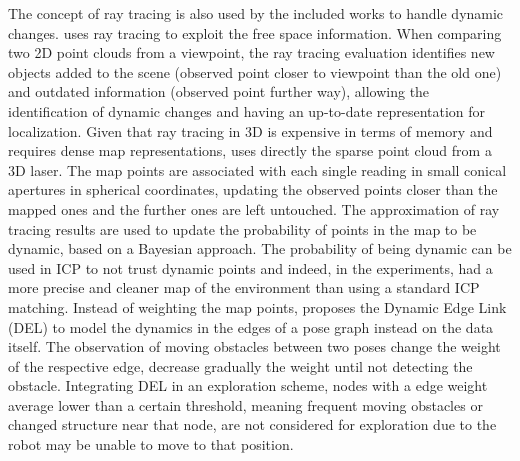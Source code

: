 The concept of ray tracing is also used by the included works to handle dynamic changes.
\cite{lázaro-et-al:2018:8594310} uses ray tracing to exploit the free space information. When comparing two 2D point clouds from a viewpoint, the ray tracing evaluation identifies new objects added to the scene (observed point closer to viewpoint than the old one) and outdated information (observed point further way), allowing the identification of dynamic changes and having an up-to-date representation for localization.
Given that ray tracing in 3D is expensive in terms of memory and requires dense map representations, \cite{pomerleau-et-al:2014:6907397} uses directly the sparse point cloud from a 3D laser. The map points are associated with each single reading in small conical apertures in spherical coordinates, updating the observed points closer than the mapped ones and the further ones are left untouched. The approximation of ray tracing results are used to update the probability of points in the map to be dynamic, based on a Bayesian approach. The probability of being dynamic can be used in ICP to not trust dynamic points and indeed, in the experiments, \cite{pomerleau-et-al:2014:6907397} had a more precise and cleaner map of the environment than using a standard ICP matching.
Instead of weighting the map points, \cite{an-et-al:2016:0} proposes the Dynamic Edge Link (DEL) to model the dynamics in the edges of a pose graph instead on the data itself. The observation of moving obstacles between two poses change the weight of the respective edge, decrease gradually the weight until not detecting the obstacle. Integrating DEL in an exploration scheme, nodes with a edge weight average lower than a certain threshold, meaning frequent moving obstacles or changed structure near that node, are not considered for exploration due to the robot may be unable to move to that position.

